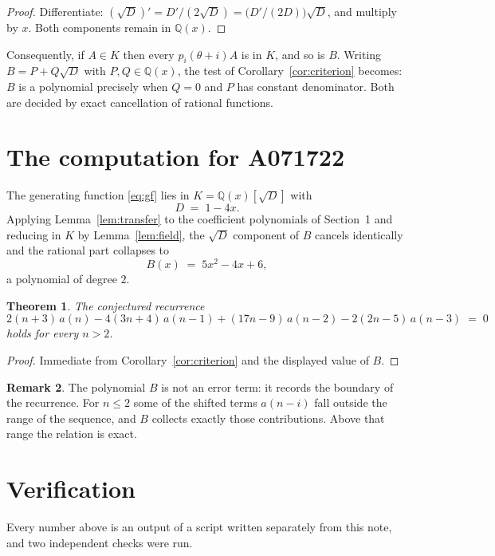 \documentclass[11pt,a4paper]{article}
\theoremstyle{plain}
\newtheorem{theorem}{Theorem}
\theoremstyle{definition}
\newtheorem{remark}[theorem]{Remark}
\begin{document}
\begin{proof}
Differentiate: $(\sqrt{D})'=D'/(2\sqrt{D})=\bigl(D'/(2D)\bigr)\sqrt{D}$, and multiply by
$x$. Both components remain in $\mathbb{Q}(x)$.
\end{proof}

Consequently, if $A\in K$ then every $p_{i}(\theta+i)A$ is in $K$, and so is $B$. Writing
$B=P+Q\sqrt{D}$ with $P,Q\in\mathbb{Q}(x)$, the test of Corollary~\ref{cor:criterion}
becomes: $B$ is a polynomial precisely when $Q=0$ and $P$ has constant denominator. Both
are decided by exact cancellation of rational functions.

\section{The computation for A071722}

The generating function \eqref{eq:gf} lies in $K=\mathbb{Q}(x)[\sqrt{D}]$ with
\[
D \;=\; 1 - 4 x .
\]
Applying Lemma~\ref{lem:transfer} to the coefficient polynomials of Section~1 and reducing
in $K$ by Lemma~\ref{lem:field}, the $\sqrt{D}$ component of $B$ cancels identically and
the rational part collapses to
\[
B(x)\;=\;5 x^{2} - 4 x + 6 ,
\]
a polynomial of degree $2$.

\begin{theorem}
The conjectured recurrence
\[
2 \left(n + 3\right)\,a(n) -  4 \left(3 n + 4\right)\,a(n-1) + (17 n - 9)\,a(n-2) -  2 \left(2 n - 5\right)\,a(n-3) \;=\;0
\]
holds for every $n>2$.
\end{theorem}

\begin{proof}
Immediate from Corollary~\ref{cor:criterion} and the displayed value of $B$.
\end{proof}

\begin{remark}
The polynomial $B$ is not an error term: it records the boundary of the recurrence. For
$n\le2$ some of the shifted terms $a(n-i)$ fall outside the range of the sequence,
and $B$ collects exactly those contributions. Above that range the relation is exact.
\end{remark}

\section{Verification}

Every number above is an output of a script written separately from this note, and two
independent checks were run.
\end{document}
